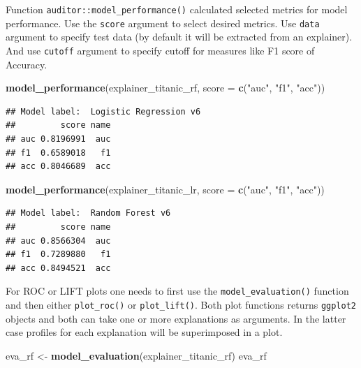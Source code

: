 \documentclass[12pt,]{krantz}
\newenvironment{Shaded}{\begin{snugshade}}{\end{snugshade}}
\newcommand{\DataTypeTok}[1]{\textcolor[rgb]{0.13,0.29,0.53}{#1}}
\newcommand{\KeywordTok}[1]{\textcolor[rgb]{0.13,0.29,0.53}{\textbf{#1}}}
\newcommand{\NormalTok}[1]{#1}
\newcommand{\StringTok}[1]{\textcolor[rgb]{0.31,0.60,0.02}{#1}}
\begin{document}
Function \texttt{auditor::model\_performance()} calculated selected metrics for model performance. Use the \texttt{score} argument to select desired metrics. Use \texttt{data} argument to specify test data (by default it will be extracted from an explainer). And use \texttt{cutoff} argument to specify cutoff for measures like F1 score of Accuracy.

\begin{Shaded}
\begin{Highlighting}[]
\KeywordTok{model_performance}\NormalTok{(explainer_titanic_rf, }\DataTypeTok{score =} \KeywordTok{c}\NormalTok{(}\StringTok{"auc"}\NormalTok{, }\StringTok{"f1"}\NormalTok{, }\StringTok{"acc"}\NormalTok{))}
\end{Highlighting}
\end{Shaded}

\begin{verbatim}
## Model label:  Logistic Regression v6 
##         score name
## auc 0.8196991  auc
## f1  0.6589018   f1
## acc 0.8046689  acc
\end{verbatim}

\begin{Shaded}
\begin{Highlighting}[]
\KeywordTok{model_performance}\NormalTok{(explainer_titanic_lr, }\DataTypeTok{score =} \KeywordTok{c}\NormalTok{(}\StringTok{"auc"}\NormalTok{, }\StringTok{"f1"}\NormalTok{, }\StringTok{"acc"}\NormalTok{))}
\end{Highlighting}
\end{Shaded}

\begin{verbatim}
## Model label:  Random Forest v6 
##         score name
## auc 0.8566304  auc
## f1  0.7289880   f1
## acc 0.8494521  acc
\end{verbatim}

For ROC or LIFT plots one needs to first use the \texttt{model\_evaluation()} function and then either \texttt{plot\_roc()} or \texttt{plot\_lift()}.
Both plot functions returns \texttt{ggplot2} objects and both can take one or more explanations as arguments. In the latter case profiles for each explanation will be superimposed in a plot.

\begin{Shaded}
\begin{Highlighting}[]
\NormalTok{eva_rf <-}\StringTok{ }\KeywordTok{model_evaluation}\NormalTok{(explainer_titanic_rf)}
\NormalTok{eva_rf}
\end{Highlighting}
\end{Shaded}
\end{document}

